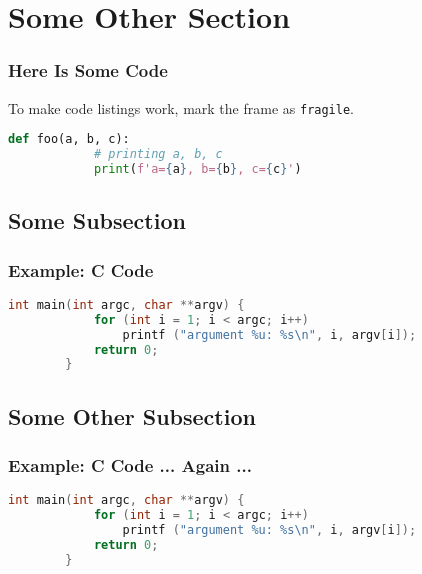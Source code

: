 \documentclass[t]{beamer}
\begin{document}
\section{Some Other Section}
\begin{frame}[fragile]
    \frametitle{Here Is Some Code}

    To make code listings work, mark the frame as \verb$fragile$.
    \begin{lstlisting}[language=python]
        def foo(a, b, c):
            # printing a, b, c
            print(f'a={a}, b={b}, c={c}')
    \end{lstlisting}
\end{frame}

\subsection{Some Subsection}
\begin{frame}[fragile]
    \frametitle{Example: C Code}

    \begin{lstlisting}[language=c]
        int main(int argc, char **argv) {
            for (int i = 1; i < argc; i++)
                printf ("argument %u: %s\n", i, argv[i]);
            return 0;
        }
    \end{lstlisting}
\end{frame}

\subsection{Some Other Subsection}
\begin{frame}[fragile]
    \frametitle{Example: C Code ... Again ...}

    \begin{lstlisting}[language=c]
        int main(int argc, char **argv) {
            for (int i = 1; i < argc; i++)
                printf ("argument %u: %s\n", i, argv[i]);
            return 0;
        }
    \end{lstlisting}
\end{frame}
\end{document}
